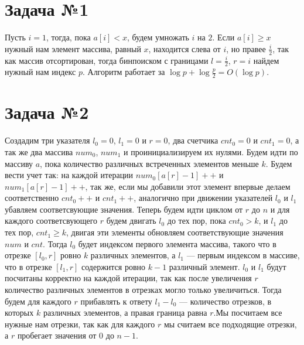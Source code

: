 \documentclass{article}
\begin{document}
\noindent
\large
\onehalfspacing
\section{Задача №1}
Пусть $i=1$, тогда, пока $a[i]<x$, будем умножать $i$ на $2$. Если $a[i]\geq x$ нужный нам элемент массива, равный $x$, находится слева от $i$, но правее $\frac{i}{2}$, так как массив отсортирован, тогда  бинпоиском с границами $l=\frac{i}{2}$, $r=i$ найдем нужный нам индекс $p$. Алгоритм работает за $\log{p}+\log{\frac{p}{2}}=O(\log{p})$.
\section{Задача №2}
Создадим три указателя $l_0=0$, $l_1=0$ и $r=0$, два счетчика $cnt_0=0$ и $cnt_1=0$, а так же два массива $num_0$, $num_1$ и проинициализируем их нулями. Будем идти по массиву $a$, пока количество различных встреченных элементов меньше $k$. Будем вести учет так: на каждой итерации $num_0[a[r]-1]++$ и $num_1[a[r] - 1]++$, так же, если мы добавили этот элемент впервые делаем соответственно $cnt_0++$ и $cnt_1++$, аналогично при движении указателей $l_0$ и $l_1$ убавляем соответсвующие значения. Теперь будем идти циклом от $r$ до $n$ и для каждого соответсвующего $r$ будем двигать $l_0$ до тех пор, пока $cnt_0>k$, и $l_1$ до тех пор, $cnt_1\geq k$, двигая эти элементы обновляем соответствующие значения $num$ и $cnt$. Тогда $l_0$ будет индексом первого элемента массива, такого что в отрезке $[l_0,r]$ ровно $k$ различных элементов, а $l_1$ --- первым индексом в массиве, что в отрезке $[l_1,r]$ содержится ровно $k-1$ различный элемент. $l_0$ и $l_1$ будут посчитаны корректно на каждой итерации, так как после увеличения $r$ количество различных элементов в отрезках могло только увеличиться. Тогда будем для каждого $r$ прибавлять к ответу $l_1-l_0$ --- количество отрезков, в которых $k$ различных элементов, а правая граница равна $r$.\newline Мы посчитаем все нужные нам отрезки, так как для каждого $r$ мы считаем все подходящие отрезки, а $r$ пробегает значения от $0$ до $n-1$.
\end{document}
